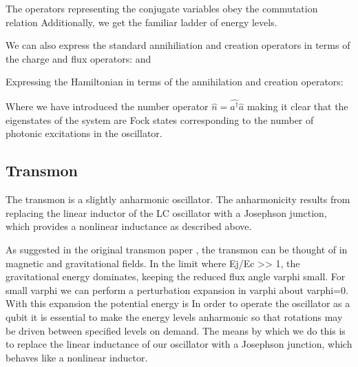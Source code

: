 The operators representing the conjugate variables obey the commutation relation
Additionally, we get the familiar ladder of energy levels.

We can also express the standard annihiliation and creation operators in terms of the charge and flux operators:
and

Expressing the Hamiltonian in terms of the annihilation and creation operators:

Where we have introduced the number operator $\hat{n} = \hat{a^\dagger} \hat{a}$ making it clear that the eigenstates of the system are Fock states corresponding to the number
of photonic excitations in the oscillator.

\subsection{Transmon}
The transmon is a slightly anharmonic oscillator.
The anharmonicity results from replacing the linear inductor of the LC oscillator with a Josephson junction, which provides a nonlinear inductance as described above.

As suggested in the original transmon paper , the transmon can be thought of in magnetic and gravitational fields.
In the limit where Ej/Ec >> 1, the gravitational energy dominates, keeping the reduced flux angle varphi small.
For small varphi we can perform a perturbation expansion in varphi about varphi=0.
With this expansion the potential energy is
In order to operate the oscillator as a qubit it is essential to make the energy levels anharmonic so that rotations may be driven between specified levels on demand.
The means by which we do this is to replace the linear inductance of our oscillator with a Josephson junction, which behaves like a nonlinear inductor.

